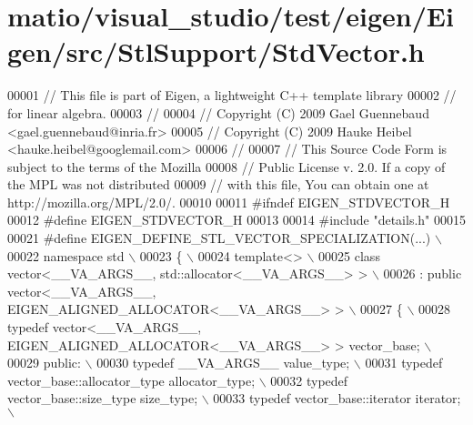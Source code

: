 \hypertarget{matio_2visual__studio_2test_2eigen_2_eigen_2src_2_stl_support_2_std_vector_8h_source}{}\section{matio/visual\+\_\+studio/test/eigen/\+Eigen/src/\+Stl\+Support/\+Std\+Vector.h}
\label{matio_2visual__studio_2test_2eigen_2_eigen_2src_2_stl_support_2_std_vector_8h_source}

\begin{DoxyCode}
00001 \textcolor{comment}{// This file is part of Eigen, a lightweight C++ template library}
00002 \textcolor{comment}{// for linear algebra.}
00003 \textcolor{comment}{//}
00004 \textcolor{comment}{// Copyright (C) 2009 Gael Guennebaud <gael.guennebaud@inria.fr>}
00005 \textcolor{comment}{// Copyright (C) 2009 Hauke Heibel <hauke.heibel@googlemail.com>}
00006 \textcolor{comment}{//}
00007 \textcolor{comment}{// This Source Code Form is subject to the terms of the Mozilla}
00008 \textcolor{comment}{// Public License v. 2.0. If a copy of the MPL was not distributed}
00009 \textcolor{comment}{// with this file, You can obtain one at http://mozilla.org/MPL/2.0/.}
00010 
00011 \textcolor{preprocessor}{#ifndef EIGEN\_STDVECTOR\_H}
00012 \textcolor{preprocessor}{#define EIGEN\_STDVECTOR\_H}
00013 
00014 \textcolor{preprocessor}{#include "details.h"}
00015 
00021 \textcolor{preprocessor}{#define EIGEN\_DEFINE\_STL\_VECTOR\_SPECIALIZATION(...) \(\backslash\)}
00022 \textcolor{preprocessor}{namespace std \(\backslash\)}
00023 \textcolor{preprocessor}{\{ \(\backslash\)}
00024 \textcolor{preprocessor}{  template<> \(\backslash\)}
00025 \textcolor{preprocessor}{  class vector<\_\_VA\_ARGS\_\_, std::allocator<\_\_VA\_ARGS\_\_> >  \(\backslash\)}
00026 \textcolor{preprocessor}{    : public vector<\_\_VA\_ARGS\_\_, EIGEN\_ALIGNED\_ALLOCATOR<\_\_VA\_ARGS\_\_> > \(\backslash\)}
00027 \textcolor{preprocessor}{  \{ \(\backslash\)}
00028 \textcolor{preprocessor}{    typedef vector<\_\_VA\_ARGS\_\_, EIGEN\_ALIGNED\_ALLOCATOR<\_\_VA\_ARGS\_\_> > vector\_base; \(\backslash\)}
00029 \textcolor{preprocessor}{  public: \(\backslash\)}
00030 \textcolor{preprocessor}{    typedef \_\_VA\_ARGS\_\_ value\_type; \(\backslash\)}
00031 \textcolor{preprocessor}{    typedef vector\_base::allocator\_type allocator\_type; \(\backslash\)}
00032 \textcolor{preprocessor}{    typedef vector\_base::size\_type size\_type;  \(\backslash\)}
00033 \textcolor{preprocessor}{    typedef vector\_base::iterator iterator;  \(\backslash\)}

\end{DoxyCode}
